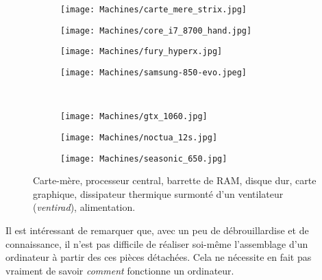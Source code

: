 \begin{figure}[!htb]
\centering
	\begin{subfigure}[b]{0.22\textwidth}
	\centering
	\texttt{[image: Machines/carte\_mere\_strix.jpg]}
	\caption{\label{fig:carte_mere_strix}}
	\end{subfigure}
\quad
	\begin{subfigure}[b]{0.22\textwidth}
	\centering
	\texttt{[image: Machines/core\_i7\_8700\_hand.jpg]}
	\caption{\label{fig:core_i7_8700_hand}}
	\end{subfigure}
\quad
	\begin{subfigure}[b]{0.22\textwidth}
	\centering
	\texttt{[image: Machines/fury\_hyperx.jpg]}
	\caption{\label{fig:fury_hyperx}}
	\end{subfigure}
\quad
	\begin{subfigure}[b]{0.22\textwidth}
	\centering
	\texttt{[image: Machines/samsung-850-evo.jpeg]}
	\caption{\label{fig:samsung-850-evo}}
	\end{subfigure}
\\
	\begin{subfigure}[b]{0.22\textwidth}
	\centering
	\texttt{[image: Machines/gtx\_1060.jpg]}
	\caption{\label{fig:gtx_1060}}
	\end{subfigure}
\quad
	\begin{subfigure}[b]{0.22\textwidth}
	\centering
	\texttt{[image: Machines/noctua\_12s.jpg]}
	\caption{\label{fig:noctua_12s}}
	\end{subfigure}
\quad
	\begin{subfigure}[b]{0.22\textwidth}
	\centering
	\texttt{[image: Machines/seasonic\_650.jpg]}
	\caption{\label{fig:seasonic_650}}
	\end{subfigure}
\caption{\protect{} Carte-mère, \protect{} processeur central, \protect{} barrette de RAM, \protect{} disque dur, \protect{} carte graphique, \protect{} dissipateur thermique surmonté d'un ventilateur (\emph{ventirad}), \protect{} alimentation.}
\end{figure}
Il est intéressant de remarquer que, avec un peu de débrouillardise et de connaissance, il n'est pas difficile de réaliser soi-même l'assemblage d'un ordinateur à partir des ces pièces détachées. Cela ne nécessite en fait pas vraiment de savoir \emph{comment} fonctionne un ordinateur.

